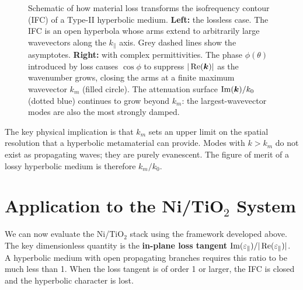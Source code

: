\begin{figure}[h]
\caption{Schematic of how material loss transforms the isofrequency contour
  (IFC) of a Type-II hyperbolic medium.
  \textbf{Left:} the lossless case. The IFC is an open hyperbola whose arms
  extend to arbitrarily large wavevectors along the $k_\parallel$ axis.
  Grey dashed lines show the asymptotes.
  \textbf{Right:} with complex permittivities. The phase $\phi(\theta)$
  introduced by loss causes $\cos\phi$ to suppress $|\operatorname{Re}(\bm{k})|$ as the
  wavenumber grows, closing the arms at a finite maximum wavevector $k_m$
  (filled circle). The attenuation surface $\operatorname{Im}(\bm{k})/k_0$ (dotted blue)
  continues to grow beyond $k_m$: the largest-wavevector modes are also
  the most strongly damped.}
\label{fig:ch2_lossy_ifc}
\end{figure}

The key physical implication is that $k_m$ sets an upper limit on the
spatial resolution that a hyperbolic metamaterial can provide. Modes with
$k > k_m$ do not exist as propagating waves; they are purely evanescent.
The figure of merit of a lossy hyperbolic medium is therefore $k_m/k_0$.

\section{Application to the Ni/TiO\texorpdfstring{$_2$}{2} System}

We can now evaluate the Ni/TiO$_2$ stack using the framework developed above.
The key dimensionless quantity is the \textbf{in-plane loss tangent}
$\operatorname{Im}(\varepsilon_{\parallel})/|\operatorname{Re}(\varepsilon_{\parallel})|$. A hyperbolic medium with open propagating branches
requires this ratio to be much less than 1. When the loss tangent is of order
1 or larger, the IFC is closed and the hyperbolic character is lost.

